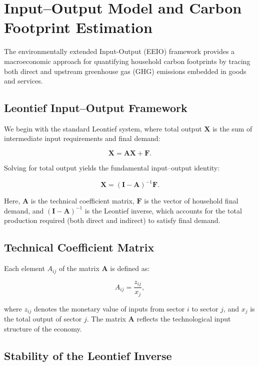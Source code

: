 \documentclass[12pt,a4paper]{article}%
\begin{document}
\section{Input–Output Model and Carbon Footprint Estimation}
The environmentally extended Input-Output (EEIO) framework provides a macroeconomic approach for quantifying household carbon footprints by tracing both direct and upstream greenhouse gas (GHG) emissions embedded in goods and services. 

\subsection{Leontief Input–Output Framework}

We begin with the standard Leontief system, where total output \( \mathbf{X} \) is the sum of intermediate input requirements and final demand:

\begin{equation}
\mathbf{X} = \mathbf{A} \mathbf{X} + \mathbf{F}.
\end{equation}

Solving for total output yields the fundamental input–output identity:

\begin{equation}
\mathbf{X} = (\mathbf{I} - \mathbf{A})^{-1} \mathbf{F}.
\end{equation}

Here, \( \mathbf{A} \) is the technical coefficient matrix, \( \mathbf{F} \) is the vector of household final demand, and \( (\mathbf{I} - \mathbf{A})^{-1} \) is the Leontief inverse, which accounts for the total production required (both direct and indirect) to satisfy final demand.

\subsection{Technical Coefficient Matrix}

Each element \( A_{ij} \) of the matrix \( \mathbf{A} \) is defined as:

\begin{equation}
A_{ij} = \frac{z_{ij}}{x_j},
\end{equation}

where \( z_{ij} \) denotes the monetary value of inputs from sector \( i \) to sector \( j \), and \( x_j \) is the total output of sector \( j \). The matrix \( \mathbf{A} \) reflects the technological input structure of the economy.

\subsection{Stability of the Leontief Inverse}
\end{document}
